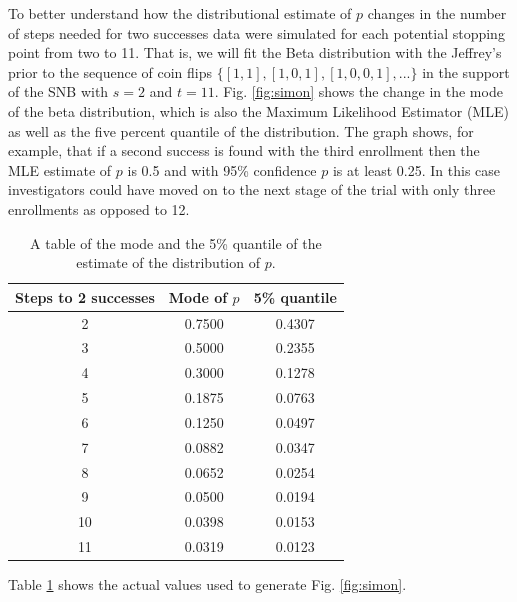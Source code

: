 \documentclass[12pt]{article}         %
\begin{document}
To better understand how the distributional estimate of $p$ changes in the 
number of steps needed for two successes data were simulated for each 
potential stopping point from two to 11. That is, we will fit the
Beta distribution with the Jeffrey's prior to the sequence of coin flips 
$\{[1,1], [1, 0, 1], [1, 0, 0, 1], ... \}$ in the support of the SNB with
$s=2$ and $t=11$.  Fig. \ref{fig:simon} shows the 
change in the mode of the beta distribution, which is also the Maximum 
Likelihood Estimator (MLE) as well as the five percent quantile of the 
distribution.  The graph shows, for example, that if a second success is 
found with the third enrollment then the MLE estimate of $p$ is 0.5 and with 
95\% confidence $p$ is at least 0.25. In this case investigators could have 
moved on to the next stage of the trial with only three enrollments as 
opposed to 12.

\begin{table}
\begin{center}
\begin{tabular}{|c|c|c|} \hline
{\bf Steps to 2 successes} & {\bf Mode of $p$} & {\bf 5\% quantile} \\ \hline
2 & 0.7500  & 0.4307 \\ \hline
3 & 0.5000  & 0.2355 \\ \hline
4 & 0.3000  & 0.1278 \\ \hline
5 & 0.1875  & 0.0763 \\ \hline
6 & 0.1250  & 0.0497 \\ \hline
7 & 0.0882  & 0.0347 \\ \hline
8 & 0.0652  & 0.0254 \\ \hline
9 & 0.0500  & 0.0194 \\ \hline
10 & 0.0398 & 0.0153 \\ \hline
11 & 0.0319 & 0.0123 \\ \hline
\end{tabular} 
\end{center}
\caption{
A table of the mode and the 5\% quantile of the estimate of the distribution of $p$.
}
\label{tab:simon}
\end{table} 

Table \ref{tab:simon} shows the actual values used to generate Fig. 
\ref{fig:simon}. 
\end{document}
